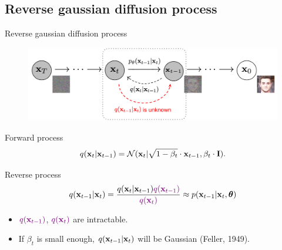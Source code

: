 \subsection{Reverse gaussian diffusion process}
\begin{frame}{Reverse gaussian diffusion process}
	\begin{figure}
		\includegraphics[width=0.8\linewidth]{figs/DDPM}
	\end{figure}
	\vspace{-0.5cm}
	\begin{block}{Forward process}
		\vspace{-0.3cm}
		\[
			q(\mathbf{x}_t | \mathbf{x}_{t-1}) = \mathcal{N}(\mathbf{x}_t | \sqrt{1 - \beta_t} \cdot \mathbf{x}_{t-1}, \beta_t \cdot \mathbf{I}).
		\]
		\vspace{-0.5cm}
	\end{block}
	\begin{block}{Reverse process}
		\vspace{-0.3cm}
		\[
			q(\mathbf{x}_{t-1}|\mathbf{x}_{t}) = \frac{q(\mathbf{x}_{t}|\mathbf{x}_{t-1}) {\color{violet}q(\mathbf{x}_{t-1})}}{{\color{violet}q(\mathbf{x}_{t})}} \approx p(\mathbf{x}_{t - 1} | \mathbf{x}_t, \boldsymbol{\theta})
		\]
		\vspace{-0.3cm}
		\begin{itemize}
			\item ${\color{violet}q(\mathbf{x}_{t-1})}$, ${\color{violet}q(\mathbf{x}_{t})}$ are intractable.
			\item If $\beta_t$ is small enough, $q(\mathbf{x}_{t-1}|\mathbf{x}_{t})$ will be Gaussian (Feller, 1949).
		\end{itemize}
	\end{block}
	\end{frame}
